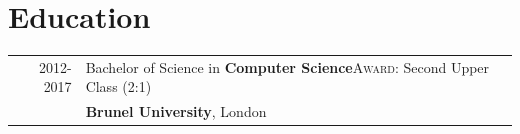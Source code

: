 \documentclass[a4paper,10pt]{extarticle} %
\begin{document}
{%
%
%


\section{\textcolor{primary}{Education}}
\begin{tabular}{r|p{17.5cm}}	
2012-2017 & Bachelor of Science in \textbf{Computer Science}\hfill\textsc{Award}: Second Upper Class (2:1)\\
&\textbf{Brunel University}, London\\
\end{tabular}



}
\end{document}
